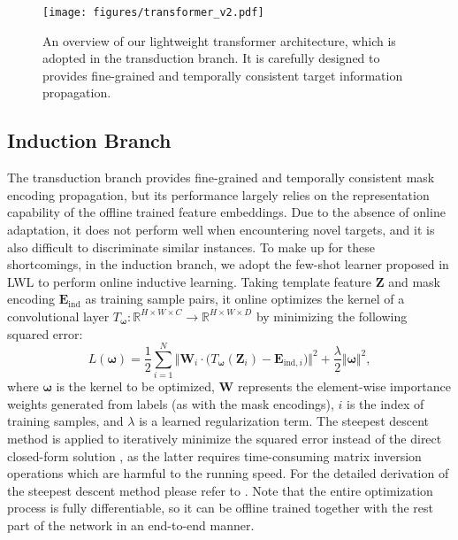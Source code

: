 \documentclass[10pt,twocolumn,letterpaper]{article}
\begin{document}
\begin{figure}[t]
	\begin{center}
	\texttt{[image: figures/transformer\_v2.pdf]}
	\vspace{-2.0em}
	\end{center}
	\caption{An overview of our lightweight transformer architecture, which is adopted in the transduction branch. It is carefully designed to provides fine-grained and temporally consistent target information propagation.}
	\label{fig:transformer}
	\vspace{-0.5em}
\end{figure}


\subsection{Induction Branch}\label{subsection:db}
The transduction branch provides fine-grained and temporally consistent mask encoding propagation, but its performance largely relies on the representation capability of the offline trained feature embeddings. Due to the absence of online adaptation, it does not perform well when encountering novel targets, and it is also difficult to discriminate similar instances. To make up for these shortcomings, in the induction branch, we adopt the few-shot learner proposed in LWL \cite{Goutam2020A} to perform online inductive learning. Taking template feature $\mathbf{Z}$ and mask encoding $\mathbf{E}_{\text{ind}}$ as training sample pairs, it online optimizes the kernel of a convolutional layer $T_{\boldsymbol{\omega}}: \mathbb{R}^{H \times W \times C} \to \mathbb{R}^{H \times W \times D}$ by minimizing the following squared error:
\begin{equation}\label{equation:minsquare}
	L(\boldsymbol{\omega}) = \frac{1}{2} \sum\limits_{i=1}^{N}\Vert\mathbf{W}_i \cdot \big( T_{\boldsymbol{\omega}}(\mathbf{Z}_i)-\mathbf{E}_{\text{ind},i}\big)\Vert^2 + \frac{\lambda}{2}\Vert \boldsymbol{\omega} \Vert^2,
\end{equation}
where $\boldsymbol{\omega}$ is the kernel to be optimized, $\mathbf{W}$ represents the element-wise importance weights generated from labels (as with the mask encodings), $i$ is the index of training samples, and $\lambda$ is a learned regularization term. The steepest descent method is applied to iteratively minimize the squared error instead of the direct closed-form solution \cite{MLCS2019A}, as the latter requires time-consuming matrix inversion operations which are harmful to the running speed. For the detailed derivation of the steepest descent method please refer to \cite{Goutam2020A}. Note that the entire optimization process is fully differentiable, so it can be offline trained together with the rest part of the network in an end-to-end manner.
\end{document}

